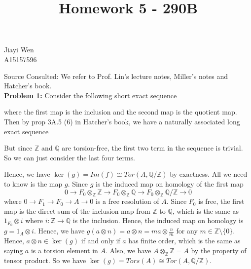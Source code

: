 \documentclass[12pt]{amsart}
\newcommand{\Q}{\mathbb{Q}}
\newcommand{\Z}{\mathbb{Z}}
\begin{document}
\title{Homework 5 - 290B}
\maketitle
\begin{center}
    Jiayi Wen\\
    A15157596
\end{center}
Source Consulted: We refer to Prof. Lin's lecture notes, Miller's notes and Hatcher's book. \\
\textbf{Problem 1:} Consider the following short exact sequence
\begin{center}
\end{center}
where the first map is the inclusion and the second map is the quotient map. Then by prop 3A.5 (6) in Hatcher's book, we have a naturally associated long exact sequence
\begin{center}
\end{center}
But since $\Z$ and $\Q$ are torsion-free, the first two term in the sequence is trivial. So we can just consider the last four terms.
\begin{center}
\end{center}
Hence, we have $\ker(g)=Im(f)\cong Tor(A,\Q/\Z)$ by exactness. All we need to know is the map $g$. Since $g$ is the induced map on homology of the first map
\[0\to F_0\otimes_\Z \Z \to F_0\otimes_\Z \Q \to F_0\otimes_\Z \Q/\Z\to 0\]
where $0\to F_1\to F_0\to A\to 0$ is a free resolution of $A$. Since $F_0$ is free, the first map is the direct sum of the inclusion map from $\Z$ to $\Q$, which is the same as $1_{F_0}\otimes i$ where $i:\Z\to \Q$ is the inclusion. Hence, the induced map on homology is $g=1_A\otimes i$. Hence, we have $g(a\otimes n)=a\otimes n=ma\otimes \frac{n}{m}$ for any $m\in \Z\setminus \{0\}$. Hence, $a\otimes n\in \ker(g)$ if and only if $a$ has finite order, which is the same as saying $a$ is a torsion element in $A$. Also, we have $A\otimes_\Z \Z=A$ by the property of tensor product. So we have $\ker(g)=Tors(A)\cong Tor(A,\Q/\Z)$.\\
\end{document}
